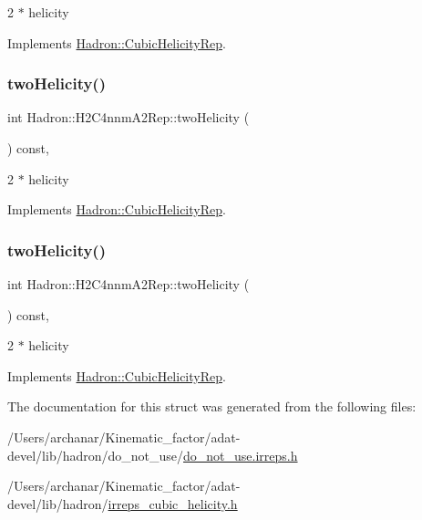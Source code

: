 2 $\ast$ helicity 

Implements \mbox{\hyperlink{structHadron_1_1CubicHelicityRep_af507aa56fc2747eacc8cb6c96db31ecc}{Hadron\+::\+Cubic\+Helicity\+Rep}}.

\mbox{\label{structHadron_1_1H2C4nnmA2Rep_ad9e40b53e19e1adae3441a6a6320d3b1}} 
\subsubsection{\texorpdfstring{twoHelicity()}{twoHelicity()}\hspace{0.1cm}{\footnotesize\ttfamily [2/3]}}
{\footnotesize\ttfamily int Hadron\+::\+H2\+C4nnm\+A2\+Rep\+::two\+Helicity (\begin{DoxyParamCaption}{ }\end{DoxyParamCaption}) const\hspace{0.3cm}{\ttfamily [inline]}, {\ttfamily [virtual]}}

2 $\ast$ helicity 

Implements \mbox{\hyperlink{structHadron_1_1CubicHelicityRep_af507aa56fc2747eacc8cb6c96db31ecc}{Hadron\+::\+Cubic\+Helicity\+Rep}}.

\mbox{\label{structHadron_1_1H2C4nnmA2Rep_ad9e40b53e19e1adae3441a6a6320d3b1}} 
\subsubsection{\texorpdfstring{twoHelicity()}{twoHelicity()}\hspace{0.1cm}{\footnotesize\ttfamily [3/3]}}
{\footnotesize\ttfamily int Hadron\+::\+H2\+C4nnm\+A2\+Rep\+::two\+Helicity (\begin{DoxyParamCaption}{ }\end{DoxyParamCaption}) const\hspace{0.3cm}{\ttfamily [inline]}, {\ttfamily [virtual]}}

2 $\ast$ helicity 

Implements \mbox{\hyperlink{structHadron_1_1CubicHelicityRep_af507aa56fc2747eacc8cb6c96db31ecc}{Hadron\+::\+Cubic\+Helicity\+Rep}}.



The documentation for this struct was generated from the following files\+:\begin{DoxyCompactItemize}
\item 
/\+Users/archanar/\+Kinematic\+\_\+factor/adat-\/devel/lib/hadron/do\+\_\+not\+\_\+use/\mbox{\hyperlink{adat-devel_2lib_2hadron_2do__not__use_2do__not__use_8irreps_8h}{do\+\_\+not\+\_\+use.\+irreps.\+h}}\item 
/\+Users/archanar/\+Kinematic\+\_\+factor/adat-\/devel/lib/hadron/\mbox{\hyperlink{adat-devel_2lib_2hadron_2irreps__cubic__helicity_8h}{irreps\+\_\+cubic\+\_\+helicity.\+h}}\end{DoxyCompactItemize}
